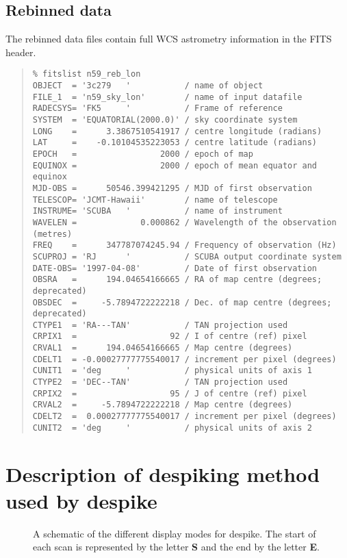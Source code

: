 \documentclass[twoside,11pt]{article}
\newcommand{\task}[1]{{\sf #1}}
\newenvironment{myquote}{\begin{quote}\begin{small}}{\end{small}\end{quote}}
\newcommand{\xlabel}[1]{}
\begin{document}
\subsection{Rebinned data}

The rebinned data files contain full WCS astrometry information \cite{WCS} in
the FITS header.

\begin{myquote}
\begin{verbatim}
% fitslist n59_reb_lon
OBJECT  = '3c279   '           / name of object
FILE_1  = 'n59_sky_lon'        / name of input datafile
RADECSYS= 'FK5     '           / Frame of reference
SYSTEM  = 'EQUATORIAL(2000.0)' / sky coordinate system
LONG    =      3.3867510541917 / centre longitude (radians)
LAT     =    -0.10104535223053 / centre latitude (radians)
EPOCH   =                 2000 / epoch of map
EQUINOX =                 2000 / epoch of mean equator and equinox
MJD-OBS =      50546.399421295 / MJD of first observation
TELESCOP= 'JCMT-Hawaii'        / name of telescope
INSTRUME= 'SCUBA   '           / name of instrument
WAVELEN =             0.000862 / Wavelength of the observation (metres)
FREQ    =      347787074245.94 / Frequency of observation (Hz)
SCUPROJ = 'RJ      '           / SCUBA output coordinate system
DATE-OBS= '1997-04-08'         / Date of first observation
OBSRA   =      194.04654166665 / RA of map centre (degrees; deprecated)
OBSDEC  =     -5.7894722222218 / Dec. of map centre (degrees; deprecated)
CTYPE1  = 'RA---TAN'           / TAN projection used
CRPIX1  =                   92 / I of centre (ref) pixel
CRVAL1  =      194.04654166665 / Map centre (degrees)
CDELT1  = -0.00027777775540017 / increment per pixel (degrees)
CUNIT1  = 'deg     '           / physical units of axis 1
CTYPE2  = 'DEC--TAN'           / TAN projection used
CRPIX2  =                   95 / J of centre (ref) pixel
CRVAL2  =     -5.7894722222218 / Map centre (degrees)
CDELT2  =  0.00027777775540017 / increment per pixel (degrees)
CUNIT2  = 'deg     '           / physical units of axis 2
\end{verbatim}
\end{myquote}


\section{\xlabel{despiking_eg}Description of despiking method used by \task{despike}\label{despiking_eg}}

\begin{figure}
\begin{center}
\caption{A schematic of the different display modes for \task{despike}. The
start of each scan is represented by the letter \textbf{S} and the end by the
letter \textbf{E}.}
\label{fig:despikemodes}
\end{center}
\end{figure}
\end{document}
